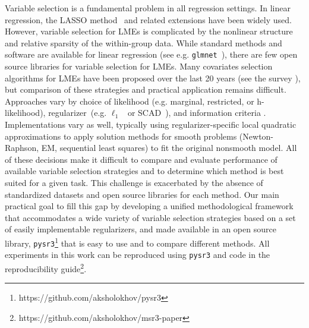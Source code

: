 Variable selection is a fundamental problem in all regression settings. In linear regression, the LASSO method~\citep{tibshirani1996regression} and related extensions have been widely used. %
However, variable selection for LMEs is complicated by the nonlinear structure and relative sparsity of the within-group data. 
While standard methods and software are available for linear regression (see e.g. \texttt{glmnet}~\cite{glmnet}), there are few open source libraries for variable selection 
for LMEs. 
Many covariates selection algorithms for LMEs have been proposed over the last 20 years (see the survey \cite{Buscemi2019Survey}), but comparison of 
these strategies and practical application remains difficult. %
Approaches vary by choice of likelihood (e.g. marginal, restricted, or h- likelihood),  
regularizer~(e.g. $\ell_1$~\citep{Krishna2008} or SCAD~\cite{ibrahim2011fixed}), and information criteria \citep{Vaida2005,Ibrahim2011}. 
Implementations vary as well, typically using regularizer-specific local quadratic approximations to apply
solution methods for smooth problems (Newton-Raphson, EM, sequential least squares) to fit the original nonsmooth model. 
All of these decisions make it  difficult to compare and evaluate performance of available 
variable selection strategies and to determine which method is best suited for a given task. 
This challenge  is exacerbated by the absence of standardized datasets 
and open source libraries for each method. 
Our main practical goal to fill this gap by developing a unified methodological framework that
accommodates a wide variety of variable selection strategies based on a set
of easily implementable regularizers, and 
made available in an open source library, \texttt{pysr3}\footnote{https://github.com/aksholokhov/pysr3} that is 
easy to use and to compare different methods. All experiments in this work can be reproduced 
using \texttt{pysr3} and code in the reproducibility guide\footnote{https://github.com/aksholokhov/msr3-paper}.

